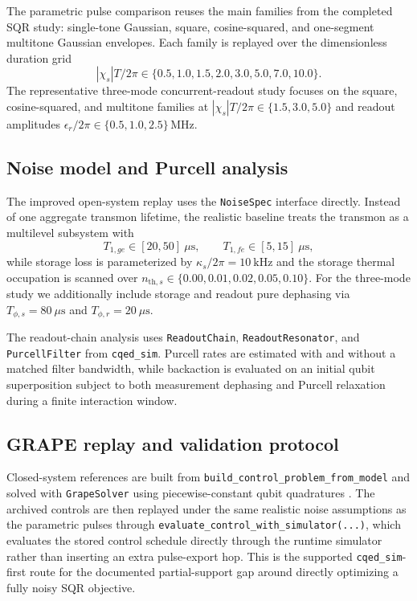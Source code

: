 \documentclass[twocolumn,prl,aps,floatfix]{revtex4-2}
\begin{document}
The parametric pulse comparison reuses the main families from the completed SQR study:
single-tone Gaussian, square, cosine-squared, and one-segment multitone Gaussian envelopes.
Each family is replayed over the dimensionless duration grid
\begin{equation}
    |\chi_s|T / 2\pi \in \{0.5, 1.0, 1.5, 2.0, 3.0, 5.0, 7.0, 10.0\}.
\end{equation}
The representative three-mode concurrent-readout study focuses on the square,
cosine-squared, and multitone families at
\( |\chi_s|T / 2\pi \in \{1.5, 3.0, 5.0\}\) and readout amplitudes
\(\epsilon_r / 2\pi \in \{0.5, 1.0, 2.5\}\,\mathrm{MHz}\).

\subsection{Noise model and Purcell analysis}

The improved open-system replay uses the \texttt{NoiseSpec} interface directly. Instead of one aggregate transmon lifetime,
the realistic baseline treats the transmon as a multilevel subsystem with
\begin{equation}
    T_{1,ge} \in [20, 50]~\mu\mathrm{s}, \qquad T_{1,fe} \in [5, 15]~\mu\mathrm{s},
\end{equation}
while storage loss is parameterized by \(\kappa_s / 2\pi = 10~\mathrm{kHz}\) and the storage thermal occupation is scanned over
\(n_{\mathrm{th},s} \in \{0.00, 0.01, 0.02, 0.05, 0.10\}\). For the three-mode study we additionally include storage and readout
pure dephasing via \(T_{\phi,s}=80~\mu\mathrm{s}\) and \(T_{\phi,r}=20~\mu\mathrm{s}\).

The readout-chain analysis uses \texttt{ReadoutChain}, \texttt{ReadoutResonator}, and \texttt{PurcellFilter} from
\texttt{cqed\_sim}. Purcell rates are estimated with and without a matched filter bandwidth, while backaction is evaluated on
an initial qubit superposition subject to both measurement dephasing and Purcell relaxation during a finite interaction window.

\subsection{GRAPE replay and validation protocol}

Closed-system references are built from \texttt{build\_control\_problem\_from\_model} and solved with \texttt{GrapeSolver}
using piecewise-constant qubit quadratures \cite{Khaneja2005}. The archived controls are then replayed under the same realistic
noise assumptions as the parametric pulses through \texttt{evaluate\_control\_with\_simulator(...)}, which evaluates the stored
control schedule directly through the runtime simulator rather than inserting an extra pulse-export hop. This is the supported
\texttt{cqed\_sim}-first route for the documented partial-support gap around directly optimizing a fully noisy SQR objective.
\end{document}
